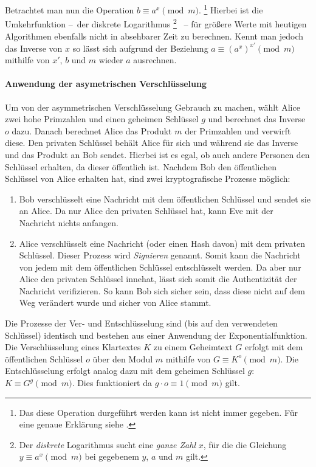 Betrachtet man nun die Operation $b \equiv a^x \pmod{m}$.%
\footnote{Das diese Operation durgeführt werden kann ist nicht immer gegeben. Für eine genaue Erklärung siehe \cite[157-160]{schmeh2007}.}
Hierbei ist die Umkehrfunktion --~der diskrete Logarithmus%
\footnote{Der \emph{diskrete} Logarithmus sucht eine \emph{ganze Zahl} $x$, für die die Gleichung $y \equiv a^x \pmod{m}$ bei gegebenem $y$, $a$ und $m$ gilt.}
~-- für größere Werte mit heutigen Algorithmen ebenfalls nicht in absehbarer Zeit zu berechnen.
Kennt man jedoch das Inverse von $x$ so lässt sich aufgrund der Beziehung $a \equiv (a^x)^{x'} \pmod{m}$ mithilfe von $x'$, $b$ und $m$ wieder $a$ ausrechnen.

\paragraph{Anwendung der asymetrischen Verschlüsselung}

Um von der asymmetrischen Verschlüsselung Gebrauch zu machen, wählt Alice zwei hohe Primzahlen und einen geheimen Schlüssel $g$ und berechnet das Inverse $o$ dazu.
Danach berechnet Alice das Produkt $m$ der Primzahlen und verwirft diese.
Den privaten Schlüssel behält Alice für sich und während sie das Inverse und das Produkt an Bob sendet.
Hierbei ist es egal, ob auch andere Personen den Schlüssel erhalten, da dieser öffentlich ist.
Nachdem Bob den öffentlichen Schlüssel von Alice erhalten hat, sind zwei kryptografische Prozesse möglich:
\begin{enumerate}
    \item Bob verschlüsselt eine Nachricht mit dem öffentlichen Schlüssel und sendet sie an Alice.
    Da nur Alice den privaten Schlüssel hat, kann Eve mit der Nachricht nichts anfangen.
    \item Alice verschlüsselt eine Nachricht (oder einen Hash davon) mit dem privaten Schlüssel.
    Dieser Prozess wird \emph{Signieren} genannt.
    Somit kann die Nachricht von jedem mit dem öffentlichen Schlüssel entschlüsselt werden.
    Da aber nur Alice den privaten Schlüssel innehat, lässt sich somit die Authentizität der Nachricht verifizieren.
    So kann Bob sich sicher sein, dass diese nicht auf dem Weg verändert wurde und sicher von Alice stammt.
\end{enumerate}

Die Prozesse der Ver- und Entschlüsselung sind (bis auf den verwendeten Schlüssel) identisch und bestehen aus einer Anwendung der Exponentialfunktion.
Die Verschlüsselung eines Klartextes $K$ zu einem Geheimtext $G$ erfolgt mit dem öffentlichen Schlüssel $o$ über den Modul $m$ mithilfe von $G \equiv K^o \pmod{m}$.
Die Entschlüsselung erfolgt analog dazu mit dem geheimen Schlüssel $g$: $K \equiv G^g \pmod{m}$.
Dies funktioniert da $g \cdot o \equiv 1 \pmod{m}$ gilt.

